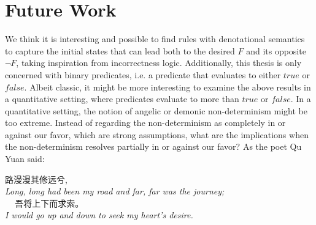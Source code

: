 \section{Future Work}
We think it is interesting and possible to find rules with denotational semantics to capture the initial states that can lead both to the desired $F$ and its opposite $\neg F$, taking inspiration from incorrectness logic.  
Additionally, this thesis is only concerned with binary predicates, i.e. a predicate that evaluates to either $true$ or $false$. 
Albeit classic, it might be more interesting to examine the above results in a quantitative setting, where predicates evaluate to more than $true$ or $false$. 
In a quantitative setting, the notion of angelic or demonic non-determinism might be too extreme. 
Instead of regarding the non-determinism as completely in or against our favor, which are strong assumptions, what are the implications when the non-determinism resolves partially in or against our favor? 
As the poet Qu Yuan said: 
\begin{center}
    路漫漫其修远兮,\\
    \textit{Long, long had been my road and far, far was the journey;} \\ 
    \ \ \,吾将上下而求索。\\
    \textit{I would go up and down to seek my heart’s desire.}~\cite{hawkes2012}
\end{center}




